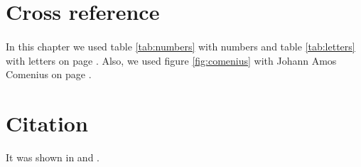 \section{Cross reference}
\paragraph{}
In this chapter we used table \ref{tab:numbers} with numbers and table \ref{tab:letters} with letters on page \pageref{tab:letters}. Also, we used figure \ref{fig:comenius} with Johann Amos Comenius on page \pageref{fig:comenius}.

\section{Citation}
It was shown in \cite{knuth:tex} and \cite{lamport:latex}.
